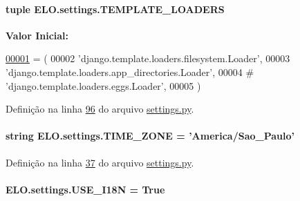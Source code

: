 \hypertarget{namespaceELO_1_1settings_a9c876284f3865d5a15a73bedccfe3bb7}{
\paragraph[{T\-E\-M\-P\-L\-A\-T\-E\-\_\-\-L\-O\-A\-D\-E\-R\-S}]{\setlength{\rightskip}{0pt plus 5cm}tuple E\-L\-O.\-settings.\-T\-E\-M\-P\-L\-A\-T\-E\-\_\-\-L\-O\-A\-D\-E\-R\-S}}\label{namespaceELO_1_1settings_a9c876284f3865d5a15a73bedccfe3bb7}
{\bfseries Valor Inicial\-:}
\begin{DoxyCode}
\hypertarget{namespaceELO_1_1settings_l00001}{}\hyperlink{namespaceELO_1_1settings}{00001} = (
00002     \textcolor{stringliteral}{'django.template.loaders.filesystem.Loader'},
00003     \textcolor{stringliteral}{'django.template.loaders.app\_directories.Loader'},
00004 \textcolor{comment}{#     'django.template.loaders.eggs.Loader',}
00005 )
\end{DoxyCode}


Definição na linha \hyperlink{settings_8py_source_l00096}{96} do arquivo \hyperlink{settings_8py_source}{settings.\-py}.

\hypertarget{namespaceELO_1_1settings_aafd318ffa70db1890eaf1f8621e19d53}{
\paragraph[{T\-I\-M\-E\-\_\-\-Z\-O\-N\-E}]{\setlength{\rightskip}{0pt plus 5cm}string E\-L\-O.\-settings.\-T\-I\-M\-E\-\_\-\-Z\-O\-N\-E = 'America/Sao\-\_\-\-Paulo'}}\label{namespaceELO_1_1settings_aafd318ffa70db1890eaf1f8621e19d53}


Definição na linha \hyperlink{settings_8py_source_l00037}{37} do arquivo \hyperlink{settings_8py_source}{settings.\-py}.

\hypertarget{namespaceELO_1_1settings_a2d03ced1be44b9d7937bdbc870474ffe}{
\paragraph[{U\-S\-E\-\_\-\-I18\-N}]{\setlength{\rightskip}{0pt plus 5cm}E\-L\-O.\-settings.\-U\-S\-E\-\_\-\-I18\-N = True}}\label{namespaceELO_1_1settings_a2d03ced1be44b9d7937bdbc870474ffe}


